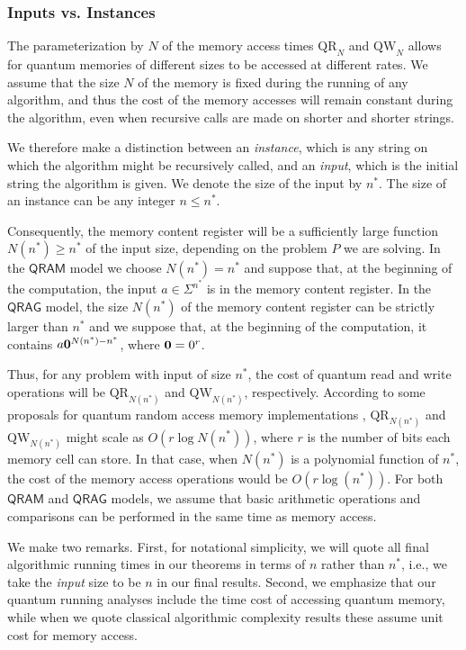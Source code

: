 \documentclass[12pt]{article}
\newcommand{\qr}{\mathrm{QR}}
\newcommand{\qw}{\mathrm{QW}}
\theoremstyle{definition}
\begin{document}
\subsubsection{Inputs vs. Instances}\label{sec:instances}

The parameterization by $N$ of the memory access times $\qr_N$ and $\qw_N$ allows for quantum memories of different sizes to be accessed at different rates. We assume that the size $N$ of the memory is fixed during the running of any algorithm, and thus the cost of the memory accesses will remain constant during the algorithm, even when recursive calls are made on shorter and shorter strings.

We therefore make a distinction between an {\em instance}, which is any string on which the algorithm might be recursively called, and an {\em input}, which is the initial string the algorithm is given. We denote the size of the input by $n^*$. The size of an instance can be any integer $n \leq n^*$.

Consequently, the memory content register will be a sufficiently large function $N(n^*) \geq n^*$ of the input size, depending on the problem $P$ we are solving.
In the $\mathsf{QRAM}$ model we choose $N(n^*) = n^*$ and suppose that, at the beginning of the computation, the input $a \in \Sigma^{n^*}$ is in the memory content register. In the $\mathsf{QRAG}$ model, the size $N(n^*)$ of the memory content register can be strictly larger than $n^*$ and we suppose that, at the beginning of the computation, it contains $a{\bf 0}^{N(n^*) - n^*}$, where ${\bf 0} = 0^r$.

Thus, for any problem with input of size $n^*$, the cost of quantum read and write operations will be $\qr_{N(n^*)}$ and $\qw_{N(n^*)}$, respectively. According to some proposals for quantum random access memory implementations \cite{GLM08, AGJMS15},
$\qr_{N(n^*)}$ and $\qw_{N(n^*)}$ might scale as $O(r\log N(n^*))$, where $r$ is the number of bits each memory cell can store. 
In that case, when $N(n^*)$ is a polynomial function of $n^*$, the cost of the memory access operations would be $O(r\log(n^*))$. 
For both $\mathsf{QRAM}$ and $\mathsf{QRAG}$ models, we assume that basic arithmetic operations and comparisons can be performed in the same time as memory access.

We make two remarks. First, for notational simplicity, we will quote all final algorithmic running times in our theorems in terms of $n$ rather than $n^*$, i.e., we take the \emph{input} size to be $n$ in our final results. Second, we emphasize that our quantum running analyses include the time cost of accessing quantum memory, while when we quote classical algorithmic complexity results these assume unit cost for memory access.
\end{document}
